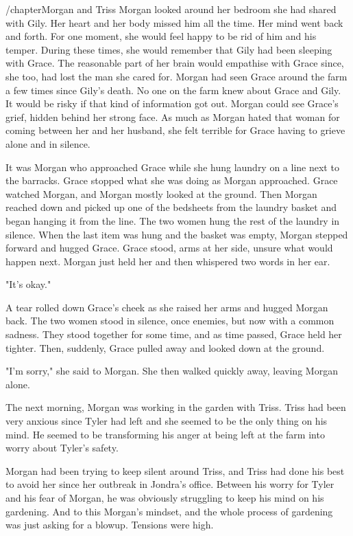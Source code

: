 \documentclass[courier]{sffms}
\begin{document}
/chapter{Morgan and Triss}
Morgan looked around her bedroom she had shared with
Gily. Her heart and her body missed him all the time.
Her mind went back and forth. For one moment, she
would feel happy to be rid of him and his temper. During
these times, she would remember that Gily had been
sleeping with Grace. The reasonable part of her brain would
empathise with Grace since, she too, had lost the man she
cared for. Morgan had seen Grace around the farm a few
times since Gily's death. No one on the farm knew about
Grace and Gily. It would be risky if that kind of information
got out. Morgan could see Grace's grief, hidden behind her
strong face. As much as Morgan hated that woman for
coming between her and her husband, she felt terrible
for Grace having to grieve alone and in silence.

It was Morgan who approached Grace while she hung
laundry on a line next to the barracks. Grace stopped
what she was doing as Morgan approached. Grace watched
Morgan, and Morgan mostly looked at the ground.
Then Morgan reached down and picked up one of the bedsheets
from the laundry basket and began hanging it from the line.
The two women hung the rest of the laundry in silence. When
the last item was hung and the basket was empty, Morgan
stepped forward and hugged Grace. Grace stood, arms at her
side, unsure what would happen next. Morgan just held her
and then whispered two words in her ear.

"It's okay."

A tear rolled down Grace's cheek as she raised her arms and
hugged Morgan back. The two women stood in silence,
once enemies, but now with a common sadness. They
stood together for some time, and as time passed, Grace
held her tighter. Then, suddenly, Grace pulled away and
looked down at the ground.

"I'm sorry," she said to Morgan. She then walked quickly
away, leaving Morgan alone.

The next morning, Morgan was working in the garden
with Triss. Triss had been very anxious since Tyler had
left and she seemed to be the only thing on his mind.
He seemed to be transforming his anger at being left
at the farm into worry about Tyler's safety.

Morgan had been trying to keep silent around Triss,
and Triss had done his best to avoid her since her outbreak
in Jondra's office. Between his worry for Tyler and his
fear of Morgan, he was obviously struggling to keep
his mind on his gardening. And to this Morgan's mindset,
and the whole process of gardening was just asking for
a blowup. Tensions were high.
\end{document}
